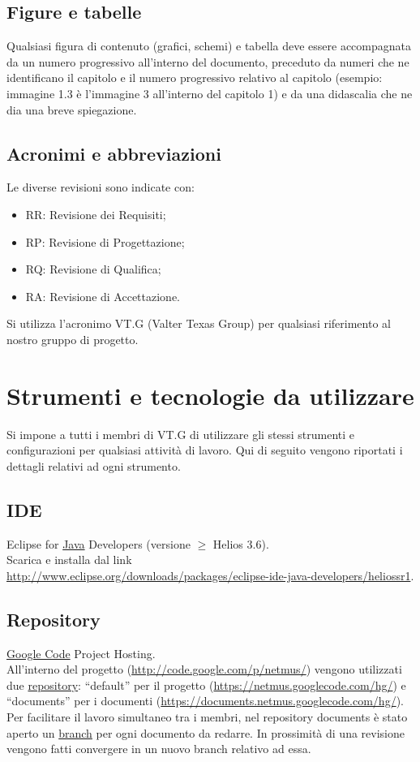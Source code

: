 \section{Figure e tabelle}
Qualsiasi figura di contenuto (grafici, schemi) e tabella deve essere
accompagnata da un numero progressivo all'interno del documento, preceduto da
numeri che ne identificano il capitolo e il numero progressivo relativo al capitolo (esempio: immagine 1.3
\`e l'immagine 3 all'interno del capitolo 1) e da una
didascalia che ne dia una breve spiegazione.

\section{Acronimi e abbreviazioni}
Le diverse revisioni sono indicate con:
\begin{itemize}
\item {RR: Revisione dei Requisiti;}
\item {RP: Revisione di Progettazione; }
\item {RQ: Revisione di Qualifica;}
\item {RA: Revisione di Accettazione.}
\end{itemize}
Si utilizza l'acronimo VT.G (Valter Texas Group) per qualsiasi riferimento al
nostro gruppo di progetto.



\chapter{Strumenti e tecnologie da utilizzare}
\thispagestyle{fancy}
Si impone a tutti i membri di VT.G di utilizzare gli stessi strumenti e
configurazioni per qualsiasi attivit\`a di lavoro. Qui di seguito vengono
riportati i dettagli relativi ad ogni strumento.

\section{IDE}
Eclipse for \underline{Java} Developers (versione $\geq$ Helios 3.6).
\\
Scarica e installa dal link\\
\url{http://www.eclipse.org/downloads/packages/eclipse-ide-java-developers/heliossr1}.
 
\section{Repository}
\underline{Google Code} Project Hosting.
\\
All'interno del progetto (\url{http://code.google.com/p/netmus/}) vengono
utilizzati due \underline{repository}: ``default'' per il progetto
(\url{https://netmus.googlecode.com/hg/}) e ``documents'' per i documenti
(\url{https://documents.netmus.googlecode.com/hg/}).\\
Per facilitare il lavoro simultaneo tra i membri, nel repository documents \`e
stato aperto un \underline{branch} per ogni documento da redarre. In prossimit\`a di una
revisione vengono fatti convergere in un nuovo branch relativo ad essa.

